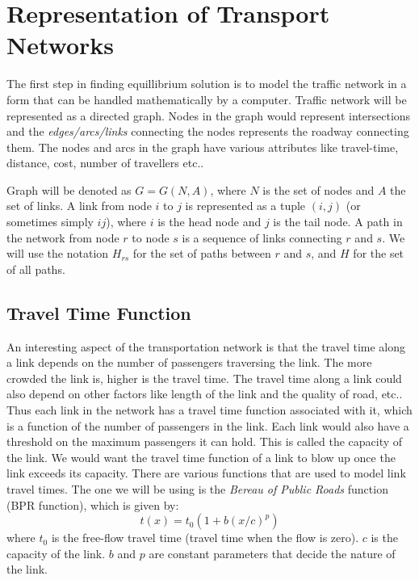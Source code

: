 \section{Representation of Transport Networks}
	The first step in finding equillibrium solution is to
	model the traffic network in a form that can be handled
	mathematically by a computer.
	Traffic network will be represented as a directed graph.
	Nodes in the graph would represent intersections and
	the \emph{edges/arcs/links} connecting the nodes represents
	the roadway connecting them.
	The nodes and arcs in the graph have various attributes
	like travel-time, distance, cost, number of travellers etc..

	Graph will be denoted as $G= G(N,A)$, where $N$ is the
	set of nodes and $A$ the set of links.
	A link from node $i$ to $j$ is represented as a
	tuple $(i,j)$ (or sometimes simply $ij$),
	where $i$ is the head node and
	$j$ is the tail node.
	A path in the network from node $r$ to node $s$
	is a sequence of links connecting $r$ and $s$.
	We will use the notation  $H_{rs}$ for the set of paths between
	$r$ and $s$, and $H$ for the set of all paths.


	\subsection{Travel Time Function}
	An interesting aspect of the transportation network is that
	the travel time along a link depends on the number of
	passengers traversing the link. The more crowded the link
	is, higher is the travel time. The travel time along a
	link could also depend on other factors like length of
	the link and the quality of road, etc.. Thus each link
	in the network has a travel time function associated
	with it, which is a function of the number of passengers in the
	link. Each link would also have a threshold on the maximum
	passengers it can hold. This is called the capacity of the
	link. We would want the travel time function of a link
	to blow up once the link exceeds its capacity. There are
	various functions that are used to model link travel times.
	The one we will be using is the \emph{Bereau of Public Roads}
	function (BPR function), which is given by:
	\[
		t(x) = t_0(1 + b(x/c)^{p})
	\]
	where $t_0$ is the free-flow travel time (travel time when
	the flow is zero). $c$ is the capacity of the link. $b$ and $p$
	are constant parameters that decide the nature of the link.

